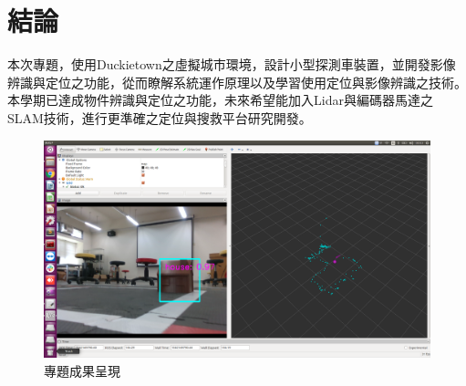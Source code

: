 \section{結論}

本次專題，使用Duckietown之虛擬城市環境，設計小型探測車裝置，並開發影像辨識與定位之功能，從而瞭解系統運作原理以及學習使用定位與影像辨識之技術。本學期已達成物件辨識與定位之功能，未來希望能加入Lidar與編碼器馬達之SLAM技術，進行更準確之定位與搜救平台研究開發。

\begin{figure}[bht]
	\centering
	\includegraphics[width=\linewidth,keepaspectratio=true]
	{images/demo.png}
	\caption{專題成果呈現}
	\label{figure:localization_result}
\end{figure}
